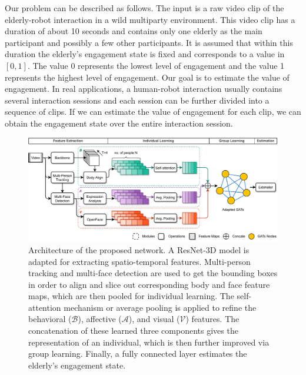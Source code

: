 \documentclass[VANCOUVER,STIX1COL]{WileyNJD-v2}
\begin{document}
Our problem can be described as follows. The input is a raw video clip of the elderly-robot interaction in a wild multiparty environment. This video clip has a duration of about 10 seconds and contains only one elderly as the main participant and possibly a few other participants. It is assumed that within this duration the elderly's engagement state is fixed and corresponds to a value in $[0, 1]$. The value 0 represents the lowest level of engagement and the value 1 represents the highest level of engagement. Our goal is to estimate the value of engagement. In real applications, a human-robot interaction usually contains several interaction sessions and each session can be further divided into a sequence of clips. If we can estimate the value of engagement for each clip, we can obtain the engagement state over the entire interaction session.

\begin{figure}[t]
  \centering
  \includegraphics[width=0.98\linewidth]{assets/pipeline}
  \caption{Architecture of the proposed network. A ResNet-3D model is adapted for extracting spatio-temporal features. Multi-person tracking and multi-face detection are used to get the bounding boxes in order to align and slice out corresponding body and face feature maps, which are then pooled for individual learning. The self-attention mechanism or average pooling is applied to refine the behavioral ($\mathcal{B}$), affective ($\mathcal{A}$), and visual ($\mathcal{V}$) features. The concatenation of these learned three components gives the  representation of an individual, which is then further improved via group learning. Finally, a fully connected layer estimates the elderly's engagement state.}
  \label{f:pipeline_4}
\end{figure}
\end{document}
